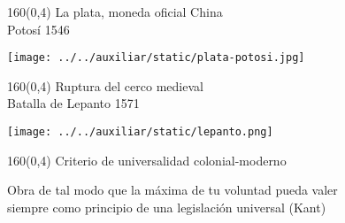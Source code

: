 \documentclass[shownotes,aspectratio=169]{beamer}
\begin{document}
\begin{frame}[plain]
\begin{textblock}{160}(0,4)
  \LARGE \centering \textcolor{black!85}{La plata, moneda oficial China} \\
  \Large Potosí 1546
  
 \end{textblock} 
\vspace{1.5cm}

\centering


\texttt{[image: ../../auxiliar/static/plata-potosi.jpg]}  
\end{frame}

\begin{frame}[plain]
\begin{textblock}{160}(0,4)
  \LARGE \centering Ruptura del cerco medieval \\
  \Large Batalla de Lepanto 1571  
\end{textblock} 
\vspace{1.5cm}
\centering
\texttt{[image: ../../auxiliar/static/lepanto.png]}  
\end{frame}


\begin{frame}[plain]
\begin{textblock}{160}(0,4)
\centering \LARGE Criterio de universalidad colonial-moderno \\
\end{textblock}
\vspace{1.5cm}
\centering

Obra de tal modo que la máxima de tu voluntad pueda valer\\
siempre como principio de una legislación universal (Kant)

\vspace{1.6cm}


\end{frame}
\end{document}
